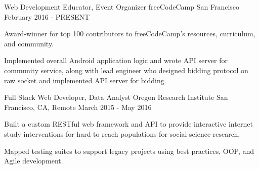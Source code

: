 \begin{cventries}
  \cventry
    {Web Development Educator, Event Organizer} %
    {freeCodeCamp} %
    {San Francisco} %
    {February 2016 - PRESENT} %
    {
      \begin{cvitems} %
        \item {Award-winner for top 100 contributors to freeCodeCamp's resources, curriculum, and community.}
        \item {Implemented overall Android application logic and wrote API server for community service, along with lead engineer who designed bidding protocol on raw socket and implemented API server for bidding.}
      \end{cvitems}
    }

  \cventry
    {Full Stack Web Developer, Data Analyst} %
    {Oregon Research Institute} %
    {San Francisco, CA, Remote} %
    {March 2015 - May 2016} %
    {
      \begin{cvitems} %
        \item {Built a custom RESTful web framework and API to provide interactive internet study interventions for hard to reach populations for social science research.}
        \item {Mapped testing suites to support legacy projects using best practices, OOP, and Agile development.}
      \end{cvitems}
    }

\end{cventries}
